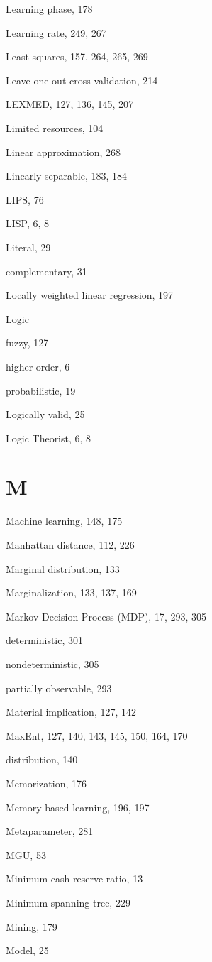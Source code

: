 \documentclass[10pt]{book}
\begin{document}
Learning phase, 178

Learning rate, 249, 267

Least squares, 157, 264, 265, 269

Leave-one-out cross-validation, 214

LEXMED, 127, 136, 145, 207

Limited resources, 104

Linear approximation, 268

Linearly separable, 183, 184

LIPS, 76

LISP, 6, 8

Literal, 29

complementary, 31

Locally weighted linear regression, 197

Logic

fuzzy, 127

higher-order, 6

probabilistic, 19

Logically valid, 25

Logic Theorist, 6, 8
\section{M}

Machine learning, 148, 175

Manhattan distance, 112, 226

Marginal distribution, 133

Marginalization, 133, 137, 169

Markov Decision Process (MDP), 17, 293, 305

deterministic, 301

nondeterministic, 305

partially observable, 293

Material implication, 127, 142

MaxEnt, 127, 140, 143, 145, 150, 164, 170

distribution, 140

Memorization, 176

Memory-based learning, 196, 197

Metaparameter, 281

MGU, 53

Minimum cash reserve ratio, 13

Minimum spanning tree, 229

Mining, 179

Model, 25
\end{document}
